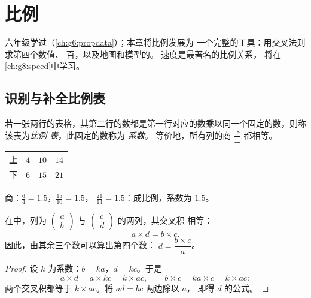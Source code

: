 \chapter{比例}\label{ch:g7:prop}

六年级学过（\cref{ch:g6:propdata}）；本章将比例发展为
一个完整的工具：用交叉法则求第四个数值、
百，以及地图和模型的。
速度是最著名的比例关系，
将在\cref{ch:g8:speed}中学习。

\section{识别与补全比例表}

\begin{definition}[比例表]\label{def:g7:prop:table}
若一张两行的表格，其第二行的数都是第一行对应的数乘以同一个固定的数，则称该表为\emph{比例
表}，此固定的数称为
\emph{系数}。
等价地，所有列的商
$\frac{\text{下}}{\text{上}}$ 都相等。
\end{definition}

\begin{example}\label{ex:g7:prop:recognize}
\begin{center}
\renewcommand{\arraystretch}{1.3}
\begin{tabular}{l|ccc}
上 & $4$ & $10$ & $14$ \\
\hline
下 & $6$ & $15$ & $21$ \\
\end{tabular}
\end{center}
商：$\frac64 = 1.5$，$\frac{15}{10} = 1.5$，
$\frac{21}{14} = 1.5$：成比例，系数为 $1.5$。
\end{example}

\begin{theorem}[交叉法则]\label{thm:g7:prop:cross}
在中，列为 $\begin{pmatrix} a \\ b
\end{pmatrix}$ 与 $\begin{pmatrix} c \\ d \end{pmatrix}$ 的两列，其交叉积
相等：
\[
a \times d = b \times c .
\]
因此，由其余三个数可以算出第四个数：
$d = \dfrac{b \times c}{a}$。
\end{theorem}

\begin{proof}
设 $k$ 为系数：$b = ka$，$d = kc$。于是
\[
a \times d = a \times kc = k \times ac,
\qquad
b \times c = ka \times c = k \times ac :
\]
两个交叉积都等于 $k \times ac$。将 $ad = bc$ 两边除以 $a$，
即得 $d$ 的公式。
\end{proof}

